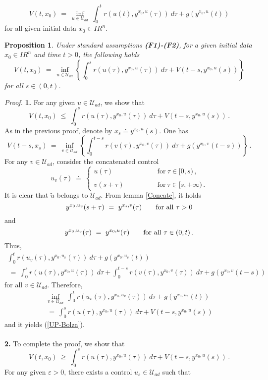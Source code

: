 \documentclass[letterpaper,12pt]{article}
\numberwithin{equation}{section}
\newcommand{\R}{\mathbb{R}}
\def\forall{\hbox{for all}~}
\def\ve{\varepsilon}
\def\R{I\!\!R}
\def\bel{\begin{equation}\label}
\def\eeq{\end{equation}}
\newtheorem{proposition}{Proposition}[theorem]
\begin{document}
\[
V(t,x_0)~=~\inf_{u\in\mathcal{U}_{ad}}~\int_{0}^tr(u(t),y^{x_0,u}(\tau))~d\tau+g(y^{x_0,u}(t))
\]
for all given initial data $x_0\in\R^n$.
\begin{proposition} Under standard assumptions {\bf (F1)-(F2)}, for a given initial data $x_0\in\R^n$ and time $t>0$, the following holds
\bel{DDP-BP}
V(t,x_0)~=~\inf_{u\in\mathcal{U}_{ad}}\left\{\int_0^{s}r(u(\tau),y^{x_0,u}(\tau))~d\tau+V(t-s,y^{x_0,u}(s))\right\}
\eeq
for all $s\in (0,t)$.
\end{proposition}
{\it Proof.} {\bf 1.} For any given $u\in\mathcal{U}_{ad}$, we show that  
\bel{UP-Bolza}
V(t,x_0)~\leq~\int_0^{s}r(u(\tau),y^{x_0,u}(\tau))~d\tau+V(t-s,y^{x_0,u}(s))\,.
\eeq
As in the previous proof, denote by $x_s\doteq y^{x_0,u}(s)$. One has 
\[
V(t-s,x_s)~=~\inf_{v\in\mathcal{U}_{ad}}\left\{\int_{0}^{t-s}r(v(\tau),y^{x_0,v}(\tau))~d\tau+g(y^{x_0,v}(t-s))\right\}\,.
\]
For any $v\in\mathcal{U}_{ad}$, consider the concatenated control 
\[
u_v(\tau)~\doteq~ \left\{\begin{array}{ll}
u(\tau)\qquad&\qquad\mathrm{for}~\tau\in [0,s)\,,\\
\\
v(s+\tau)\qquad&\qquad\mathrm{for}~\tau\in [s,+\infty)\,.
\end{array}\right.
\]
It is clear that $\tilde{u}$ belongs to $\mathcal{U}_{ad}$. From lemma \ref{Concate}, it holds 
\[
y^{x_0,u_v}(s+\tau)~=~y^{x_s,v}(\tau)\qquad\forall \tau>0
\]
and 
\[
y^{x_0,u_v}(\tau)~=~y^{x_0,u}(\tau)\qquad\forall \tau\in (0,t)\,.
\]
Thus,
\begin{multline*}
\int_{0}^tr(u_v(\tau),y^{x_0,u_{v}}(\tau))~d\tau+g(y^{x_0,u_v}(t))\\
~=~\int_{0}^sr(u(\tau),y^{x_0,u}(\tau))~d\tau+\int_{0}^{t-s}r(v(\tau),y^{x_0,v}(\tau))~d\tau+g(y^{x_0,v}(t-s))
\end{multline*}
for all $v\in\mathcal{U}_{ad}$. Therefore,
\begin{multline*}
\inf_{v\in\mathcal{U}_{ad}}~\int_{0}^tr(u_v(\tau),y^{x_0,u_{v}}(\tau))~d\tau+g(y^{x_0,u_v}(t))\\
~=~\int_{0}^sr(u(\tau),y^{x_0,u}(\tau))~d\tau+V(t-s,y^{x_0,u}(s))
\end{multline*}
and it yields (\ref{UP-Bolza}).
\quad\\
\quad\\
{\bf 2.} To complete the proof, we show that 
\bel{Low-Bolza}
V(t,x_0)~\geq~\int_0^{s}r(u(\tau),y^{x_0,u}(\tau))~d\tau+V(t-s,y^{x_0,u}(s))\,.
\eeq
For any given $\ve>0$, there exists a control $u_{\ve}\in\mathcal{U}_{ad}$ such that 
\end{document}
